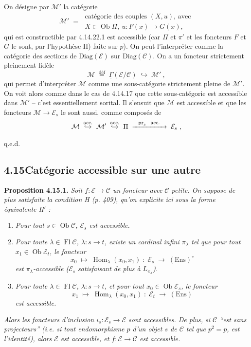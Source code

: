 \documentclass[11pt]{article}
\newcommand{\printedpage}[1]{\marginpar{\footnotesize p.~#1}}
\newcommand{\msp}[1]{\marginpar{\footnotesize [#1]}}
\newcommand{\Ob}{\operatorname{Ob}}
\newcommand{\Fl}{\operatorname{Fl}}
\newcommand{\Hom}{\operatorname{Hom}}
\newcommand{\defeq}{\overset{\text{déf}}{=}}
\newcommand{\Ens}{\mathrm{Ens}}
\newcommand{\pr}{\mathrm{pr}}
\newcommand{\cE}{\mathcal{E}}
\newcommand{\cC}{\mathcal{C}}
\newcommand{\cM}{\mathcal{M}}
\begin{document}
\printedpage{161}

\msp{page 424}
On désigne par $\cM'$ la catégorie
\[
\cM' \;=\;
\begin{array}{l}
\text{catégorie des couples } (X,u)\text{, avec}\\
X \in \Ob\Pi,\ u : F(x) \longrightarrow G(x),
\end{array}
\] %
qui est constructible par 4.14.22.1 est accessible (car $\Pi$ et $\pi'$ et les foncteurs $F$ et $G$ le sont, par l'hypothèse H) faite sur $p$). On peut l'interpréter comme la catégorie des sections %
de $\mathrm{Diag}(\cE)$ sur $\mathrm{Diag}(\cC)$. On a un foncteur strictement pleinement fidèle
\[
\cM \;\defeq\; \underline{\Gamma}(\cE/\cC) \;\hookrightarrow\; \cM'\ ,
\]
qui permet d'interpréter $\cM$ comme une sous-catégorie strictement pleine de $\cM'$. On voit alors comme dans le cas de 4.14.17 que cette sous-catégorie est accessible dans $\cM'$ -- c'est essentiellement sorital. Il s'ensuit que $\cM$ est accessible et que les foncteurs $\cM \longrightarrow \cE_s$ le sont aussi, comme composés de
\[
\cM \;\overset{\text{\upshape acc.}}{\hookrightarrow}\; \cM' \;\overset{\text{\upshape acc.}}{\hookrightarrow}\; \Pi \;\xrightarrow{\ \ \pr_s\ \ \text{\upshape acc.}\ \ }\; \cE_s\ ,
\]

\hfill q.e.d.

\msp{page 425}

\subsection*{4.15\quad Catégorie accessible sur une autre}

\textbf{Proposition 4.15.1.} \textit{Soit $f : \cE \longrightarrow \cC$ un foncteur avec $\cC$ petite. On suppose de plus satisfaite la condition H (p. 409), qu'on explicite ici sous la forme équivalente H$'$ :}
\begin{enumerate}
\item[\textit{H 1)}] \textit{Pour tout $s \in \Ob\cC$, $\cE_s$ est accessible.}
\item[\textit{H 2)}] \textit{Pour toute $\lambda \in \Fl\cC$, $\lambda : s \longrightarrow t$, existe un cardinal infini $\pi_\lambda$ tel que pour tout $x_1 \in \Ob\cE_t$, le foncteur}
\[
x_0 \;\longmapsto\; \Hom_\lambda(x_0,x_1) \;:\; \cE_s \;\longrightarrow\; (\Ens)^\circ
\]
\textit{est $\pi_\lambda$-accessible ($\cE_s$ satisfaisant de plus à $L_{\pi_\lambda}$).}
\item[\textit{H 3)}] \textit{Pour toute $\lambda \in \Fl\cC$, $\lambda : s \longrightarrow t$, et pour tout $x_0 \in \Ob\cE_s$, le foncteur}
\[
x_1 \;\longmapsto\; \Hom_\lambda(x_0,x_1) \;:\; \cE_t \;\longrightarrow\; (\Ens)
\]
\textit{est accessible.}
\end{enumerate}
\textit{Alors les foncteurs d'inclusion $i_s : \cE_s \longrightarrow \cE$ sont accessibles. De plus, si $\cC$ ``est sans projecteurs'' (i.e. si tout endomorphisme $p$ d'un objet $s$ de $\cC$ tel que $p^2 = p$, est l'identité), alors $\cE$ est accessible, et $f : \cE \longrightarrow \cC$ est accessible.}
\end{document}
